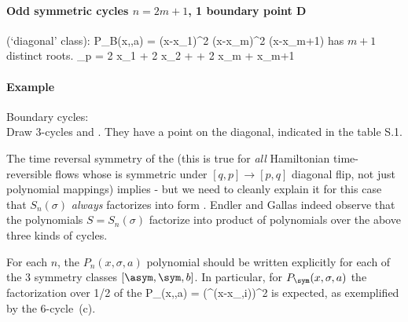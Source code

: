 \paragraph{Odd symmetric cycles $n=2m+1$, 1 boundary point D }
 (`diagonal' class):
\beq
P_{B}(x,\sigma,a) = (x-x_{1})^2 \cdots (x-x_{m})^2 (x-x_{m+1})
has $m+1$ distinct roots.
\beq
\sigma_p = 2 x_{1} + 2 x_{2} + \cdot + 2 x_{m} + x_{m+1}

\paragraph{Example}
Boundary cycles:\\
Draw 3-cycles  and .
They have a point on the diagonal, indicated in
the table S.1.

The time reversal symmetry of the {\statesp} (this is true for
{\em all}
Hamiltonian time-reversible flows whose {\PoincSec} is symmetric
under $[q,p] \to [p,q]$ diagonal flip, not just polynomial mappings) implies
- but we need to cleanly explain it for this case
that $S_n(\sigma)$
{\em always} factorizes into form .
Endler and Gallas indeed observe that the polynomials
$S=S_n(\sigma)$ factorize into
product of polynomials over the above three kinds of cycles.

For each $n$, the $P_n(x,\sigma,a)$ polynomial should be written explicitly
for each of the 3 symmetry classes $[\asym,\sym,b]$. In particular,
for $P_{\sym}(x,\sigma,a)$ the factorization
over 1/2 of the {\statesp}
\beq
P_{\sym}(x,\sigma,a) = \left(\prod^{\symf}(x-x_{\symf,i})\right)^2
is expected, as exemplified by the 6-cycle
\,(c).

